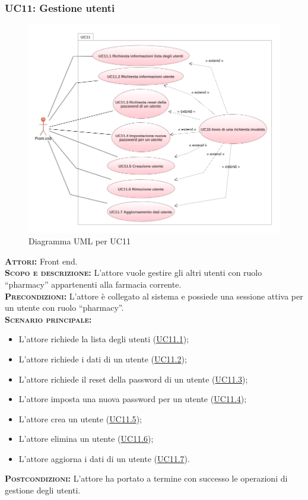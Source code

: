 \subsubsection{UC11: Gestione utenti}
\label{sec:UC11}
\begin{figure}[h!]
    \centering
    \includegraphics[width=\textwidth]{figures/uc/uc11.png}
    \caption[Diagramma UML per UC11]{Diagramma UML per UC11
    \label{fig:uc11}}
\end{figure}
\textsc{\textbf{Attori:}} Front end.\\
\textsc{\textbf{Scopo e descrizione:}} L'attore vuole gestire gli altri utenti con ruolo ``pharmacy'' appartenenti alla farmacia corrente.\\
\textsc{\textsc{\textbf{Precondizioni:}}} L'attore è collegato al sistema e possiede una sessione attiva per un utente con ruolo ``pharmacy''.\\
\textsc{\textbf{Scenario principale:}}
\begin{itemize}
    \item L'attore richiede la lista degli utenti (\hyperref[sec:UC111]{UC11.1});
    \item L'attore richiede i dati di un utente (\hyperref[sec:UC112]{UC11.2});
    \item L'attore richiede il reset della password di un utente (\hyperref[sec:UC113]{UC11.3});
    \item L'attore imposta una nuova password per un utente  (\hyperref[sec:UC114]{UC11.4});
    \item L'attore crea un utente (\hyperref[sec:UC115]{UC11.5});
    \item L'attore elimina un utente (\hyperref[sec:UC116]{UC11.6});
    \item L'attore aggiorna i dati di un utente (\hyperref[sec:UC117]{UC11.7}).
\end{itemize}
\textsc{\textbf{Postcondizioni:}} L'attore ha portato a termine con successo le operazioni di gestione degli utenti.

